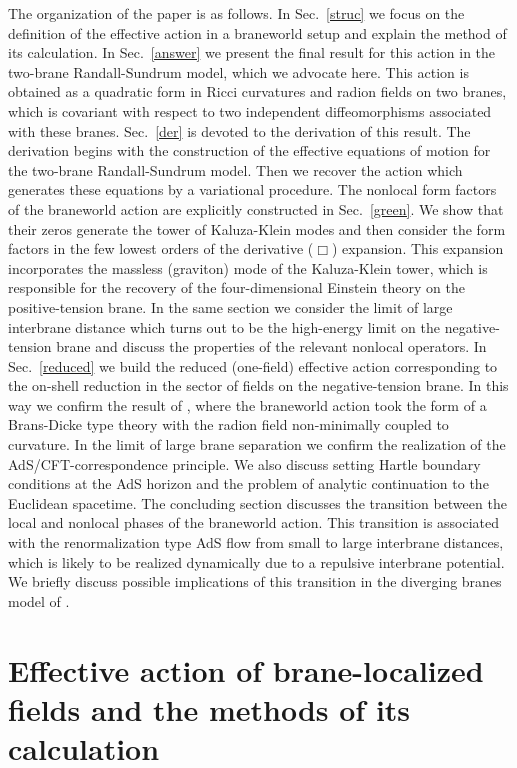 \documentclass[a4paper,preprint,nofootinbib,
                 showpacs,preprintnumbers,amsmath,amssymb]{revtex4}
\begin{document}
The organization of the paper is as follows. In Sec.~\ref{struc} 
we focus on the definition of the effective 
action in a braneworld setup and explain the 
method of its calculation. In Sec.~\ref{answer} we 
present the final result for this action in the two-brane 
Randall-Sundrum model, which we advocate here. This action is 
obtained as a quadratic form in Ricci curvatures and radion fields 
on two branes, which is covariant with respect to two independent 
diffeomorphisms associated with these branes. Sec.~\ref{der} is 
devoted to the derivation of this result. The 
derivation begins with the construction of the 
effective equations of motion for the two-brane Randall-Sundrum 
model. Then we recover the action which 
generates these equations by a variational procedure. 
The nonlocal form factors of the braneworld action are explicitly 
constructed in Sec.~\ref{green}. We show that their zeros generate  
the tower of Kaluza-Klein modes and then consider the form factors  
in the few lowest orders of the derivative ($\Box$) expansion. This  
expansion incorporates the massless (graviton) mode of the  
Kaluza-Klein tower, which is responsible for the recovery of  
the four-dimensional Einstein theory on the positive-tension brane.  
In the same section we consider the limit of large interbrane  
distance which turns out to be the high-energy limit on the  
negative-tension brane and discuss the properties of the relevant 
nonlocal operators. In Sec.~\ref{reduced} we build the reduced  
(one-field) effective action corresponding to the on-shell  
reduction in the sector of fields on the negative-tension brane.  
In this way we confirm the result of \cite{brane}, where the  
braneworld action took the 
form of a Brans-Dicke type theory with the radion field 
non-minimally coupled to curvature. In the limit of large brane 
separation we confirm the realization of the 
AdS/CFT-correspondence principle. We also discuss setting Hartle 
boundary conditions at the AdS horizon and the problem of analytic 
continuation to the Euclidean spacetime. The concluding section 
discusses the transition between the local and 
nonlocal phases of the braneworld action. This transition is  
associated with the renormalization type AdS flow from small to  
large interbrane distances, which is likely to be realized  
dynamically due to a repulsive interbrane potential. We briefly  
discuss possible implications of this transition in the diverging  
branes model of \cite{brane}. 
 
 
\section{Effective action of brane-localized fields and the  
methods of its calculation\label{struc}} 
 
\end{document}
